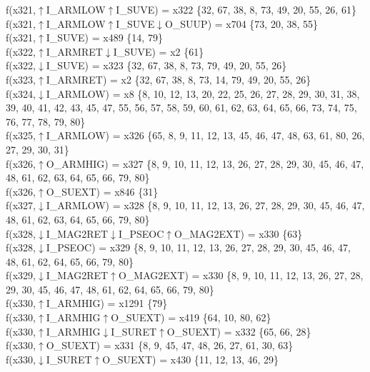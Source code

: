 f(x321,$\uparrow$I\_ARMLOW$\uparrow$I\_SUVE) = x322 \{32, 67, 38, 8, 73, 49, 20, 55, 26, 61\} \\  
f(x321,$\uparrow$I\_ARMLOW$\uparrow$I\_SUVE$\downarrow$O\_SUUP) = x704 \{73, 20, 38, 55\} \\  
f(x321,$\uparrow$I\_SUVE) = x489 \{14, 79\} \\  
f(x322,$\uparrow$I\_ARMRET$\downarrow$I\_SUVE) = x2 \{61\} \\  
f(x322,$\downarrow$I\_SUVE) = x323 \{32, 67, 38, 8, 73, 79, 49, 20, 55, 26\} \\  
f(x323,$\uparrow$I\_ARMRET) = x2 \{32, 67, 38, 8, 73, 14, 79, 49, 20, 55, 26\} \\  
f(x324,$\downarrow$I\_ARMLOW) = x8 \{8, 10, 12, 13, 20, 22, 25, 26, 27, 28, 29, 30, 31, 38, 39, 40, 41, 42, 43, 45, 47, 55, 56, 57, 58, 59, 60, 61, 62, 63, 64, 65, 66, 73, 74, 75, 76, 77, 78, 79, 80\} \\  
f(x325,$\uparrow$I\_ARMLOW) = x326 \{65, 8, 9, 11, 12, 13, 45, 46, 47, 48, 63, 61, 80, 26, 27, 29, 30, 31\} \\  
f(x326,$\uparrow$O\_ARMHIG) = x327 \{8, 9, 10, 11, 12, 13, 26, 27, 28, 29, 30, 45, 46, 47, 48, 61, 62, 63, 64, 65, 66, 79, 80\} \\  
f(x326,$\uparrow$O\_SUEXT) = x846 \{31\} \\  
f(x327,$\downarrow$I\_ARMLOW) = x328 \{8, 9, 10, 11, 12, 13, 26, 27, 28, 29, 30, 45, 46, 47, 48, 61, 62, 63, 64, 65, 66, 79, 80\} \\  
f(x328,$\downarrow$I\_MAG2RET$\downarrow$I\_PSEOC$\uparrow$O\_MAG2EXT) = x330 \{63\} \\  
f(x328,$\downarrow$I\_PSEOC) = x329 \{8, 9, 10, 11, 12, 13, 26, 27, 28, 29, 30, 45, 46, 47, 48, 61, 62, 64, 65, 66, 79, 80\} \\  
f(x329,$\downarrow$I\_MAG2RET$\uparrow$O\_MAG2EXT) = x330 \{8, 9, 10, 11, 12, 13, 26, 27, 28, 29, 30, 45, 46, 47, 48, 61, 62, 64, 65, 66, 79, 80\} \\  
f(x330,$\uparrow$I\_ARMHIG) = x1291 \{79\} \\  
f(x330,$\uparrow$I\_ARMHIG$\uparrow$O\_SUEXT) = x419 \{64, 10, 80, 62\} \\  
f(x330,$\uparrow$I\_ARMHIG$\downarrow$I\_SURET$\uparrow$O\_SUEXT) = x332 \{65, 66, 28\} \\  
f(x330,$\uparrow$O\_SUEXT) = x331 \{8, 9, 45, 47, 48, 26, 27, 61, 30, 63\} \\  
f(x330,$\downarrow$I\_SURET$\uparrow$O\_SUEXT) = x430 \{11, 12, 13, 46, 29\} \\  
